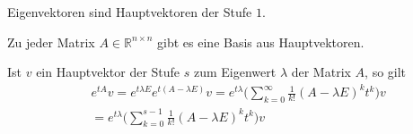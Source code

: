 \begin{Bemerkung}
Eigenvektoren sind Hauptvektoren der Stufe $1$.
\end{Bemerkung}


\begin{Satz}
Zu jeder Matrix $A \in \mathbb{R}^{n \times n}$ gibt es eine Basis aus Hauptvektoren. 
\end{Satz}


\begin{Bemerkung}
Ist $v$ ein Hauptvektor der Stufe $s$ zum Eigenwert $\lambda$ der Matrix $A$, so gilt
\begin{align*}
& e^{tA}v = e^{t \lambda E} e^{t(A - \lambda E)} v = e^{t \lambda}  \biggl( \sum_{k=0}^{\infty} \frac{1}{k!} (A - \lambda E)^k t^k \biggr) v \\
& =  e^{t \lambda}  \biggl ( \sum_{k=0}^{s -1} \frac{1}{k!} (A - \lambda E)^k t^k \biggr) v 
\end{align*}
\end{Bemerkung}
